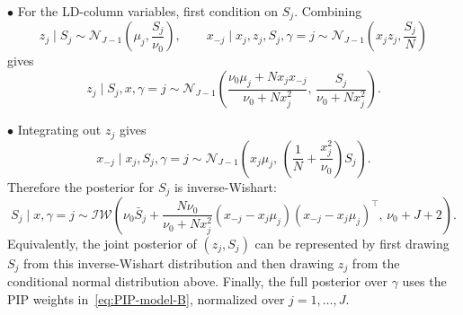 \documentclass[11pt]{article}
\newcommand{\Normal}{\mathcal N}
\begin{document}
$\bullet$ For the LD-column variables, first condition on $S_j$. Combining
\[
z_j\mid S_j\sim \Normal_{J-1}\left(\mu_j,\frac{S_j}{\nu_0}\right),
\qquad
x_{-j}\mid x_j,z_j,S_j,\gamma=j
\sim
\Normal_{J-1}\left(x_jz_j,\frac{S_j}{N}\right)
\]
gives
\[
\boxed{
z_j\mid S_j,x,\gamma=j
\sim
\Normal_{J-1}\left(
\frac{\nu_0\mu_j+Nx_jx_{-j}}{\nu_0+Nx_j^2},\,
\frac{S_j}{\nu_0+Nx_j^2}
\right).
}
\]

$\bullet$ Integrating out $z_j$ gives
\[
x_{-j}\mid x_j,S_j,\gamma=j
\sim
\Normal_{J-1}\left(
x_j\mu_j,\,
\left(\frac{1}{N}+\frac{x_j^2}{\nu_0}\right)S_j
\right).
\]
Therefore the posterior for $S_j$ is inverse-Wishart:
\[
\boxed{
S_j\mid x,\gamma=j
\sim
\mathcal{IW}\left(
\nu_0\bar S_j+
\frac{N\nu_0}{\nu_0+Nx_j^2}
(x_{-j}-x_j\mu_j)(x_{-j}-x_j\mu_j)^\top,\,
\nu_0+J+2
\right).
}
\]
Equivalently, the joint posterior of $(z_j,S_j)$ can be represented by first
drawing $S_j$ from this inverse-Wishart distribution and then drawing $z_j$
from the conditional normal distribution above. Finally, the full posterior
over $\gamma$ uses the PIP weights in~\eqref{eq:PIP-model-B}, normalized over
$j=1,\ldots,J$.
\end{document}
